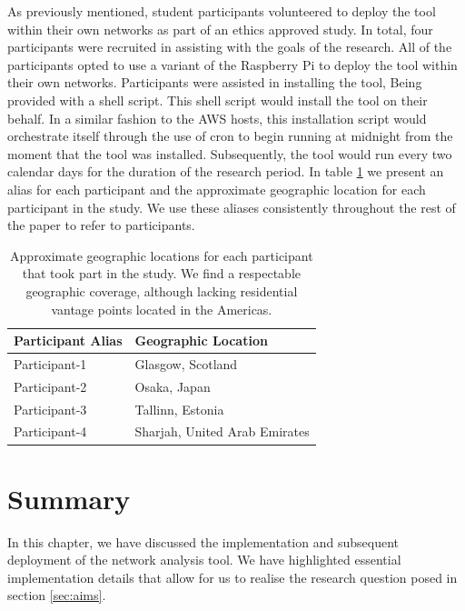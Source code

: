 \documentclass{l4proj}
\begin{document}
As previously mentioned, student participants volunteered to deploy the tool within their own networks as part of an ethics approved study. In total, four participants were recruited in assisting with the goals of the research. All of the participants opted to use a variant of the Raspberry Pi to deploy the tool within their own networks. Participants were assisted in installing the tool, Being provided with a shell script.  This shell script would install the tool on their behalf. In a similar fashion to the AWS hosts, this installation script would orchestrate itself through the use of cron to begin running at midnight from the moment that the tool was installed. Subsequently, the tool would run every two calendar days for the duration of the research period. In table \ref{table:participants} we present an alias for each participant and the approximate geographic location for each participant in the study. We use these aliases consistently throughout the rest of the paper to refer to participants.


\begin{table}[H]
\centering
\begin{tabular}{|l|l|}
\hline
\textbf{Participant Alias} & \textbf{Geographic Location}    \\ \hline
Participant-1     & Glasgow, Scotland      \\ \hline
Participant-2     & Osaka, Japan                \\ \hline
Participant-3     & Tallinn, Estonia              \\ \hline
Participant-4     & Sharjah, United Arab Emirates \\ \hline
\end{tabular}

\caption{Approximate geographic locations for each participant that took part in the study. We find a respectable geographic coverage, although lacking residential vantage points located in the Americas.}
\label{table:participants}
\end{table}

\section{Summary}

In this chapter, we have discussed the implementation and subsequent deployment of the network analysis tool. We have highlighted essential implementation details that allow for us to realise the research question posed in section \ref{sec:aims}.
\end{document}
